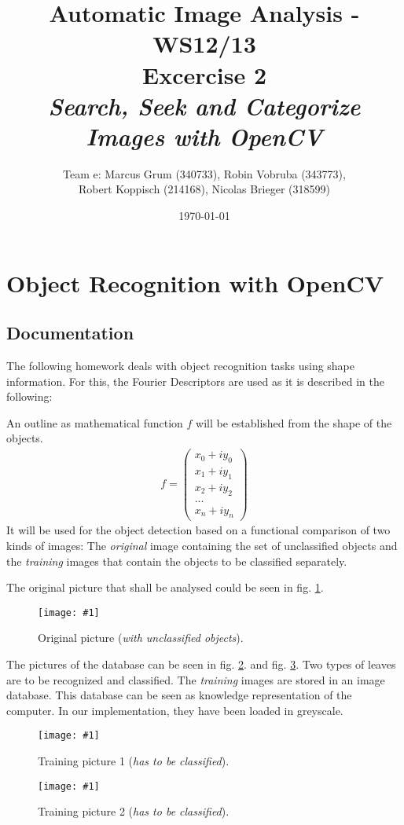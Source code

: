\documentclass[a4paper,headings=small]{scrartcl}
\title{Automatic Image Analysis - WS12/13 \\ Excercise 2 \\ \emph{Search, Seek and Categorize Images with OpenCV}}
\author{Team e: Marcus Grum (340733), Robin Vobruba (343773), \\ Robert Koppisch (214168), Nicolas Brieger (318599)}
\date{\today}
\numberwithin{equation}{section} %
\numberwithin{figure}{section}   %
\newcommand{\image}[3]{
	\begin{figure}[htbp]
		\centering
		\texttt{[image: \#1]}
		\caption{#3}
		\label{fig:#1}
	\end{figure}
}
\begin{document}
\maketitle



\section{Object Recognition with OpenCV}


\subsection{Documentation}

The following homework deals with object recognition tasks using shape information.
For this, the Fourier Descriptors are used as it is described in the following:

An outline as mathematical function $f$ will be established from the shape of the objects.
\begin{align}
f=\begin{pmatrix} x_0 + i y_0 \\ x_1 + i y_1 \\ x_2 + i y_2 \\ ... \\ x_n + i y_n \end{pmatrix} 
\end{align}
It will be used for the object detection based on a functional comparison of two kinds of images:
The \emph{original} image containing the set of unclassified objects 
and the \emph{training} images that contain the objects to be classified separately.

The original picture that shall be analysed could be seen in fig. \ref{fig:../../../target/pic_input}.

\image{../../../target/pic_input}{1}{%
		Original picture (\emph{with unclassified objects}).}

The pictures of the database can be seen in fig. \ref{fig:../../../target/pic_db1}.
and fig. \ref{fig:../../../target/pic_db2}. Two types of leaves are to be
recognized and classified. The \emph{training} images are stored in an image database. 
This database can be seen as knowledge representation of the computer. 
In our implementation, they have been loaded in greyscale.

\image{../../../target/pic_db1}{0.2}{%
		Training picture 1 (\emph{has to be classified}).}
\image{../../../target/pic_db2}{0.5}{%
		Training picture 2 (\emph{has to be classified}).}
\end{document}
